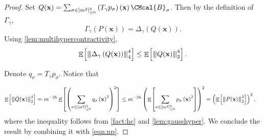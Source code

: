 \documentclass[11pt]{article}
\def\B{\CMcal{B}}
\theoremstyle{plain}
\theoremstyle{definition}
\newcommand {\minusspace} {\: \! \!}
\newcommand {\Fn} [2] {\ensuremath{ #1 \minusspace \Br{ #2 } }}
\newcommand {\br} [1] {\ensuremath{ \left( #1 \right) }}
\newcommand {\Br} [1] {\ensuremath{ \left[ #1 \right] }}
\DeclareMathOperator*{\bigE}{\mathbb{E}}
\newcommand {\expec} [2] {\Fn{\bigE_{\substack{#1}}}{#2}}
\newcommand{\nnorm}[1]{{\left\vert\kern-0.25ex\left\vert\kern-0.25ex\left\vert #1
		\right\vert\kern-0.25ex\right\vert\kern-0.25ex\right\vert}}
\newcommand{\randx}{\ensuremath{\mathbf{x}}}
\newcommand{\1}{\mathbb{1}} %
\begin{document}
	\begin{proof}

		Set $ Q(\randx)=\sum_{\sigma\in[m^2]_{\geq0}^h}\br{T_\gamma p_\sigma}\br{\randx}\B_\sigma$. Then by the definition of $\Gamma_{\gamma}$,
		\[\Gamma_{\gamma}\br{P(\randx)}=\Delta_{\gamma}\br{Q(\randx)}.\]
		\noindent Using \cref{lem:multihypercontractivity},
		\begin{equation}\label{eqn:np}
\expec{}{\nnorm{\Delta_{\gamma}\br{Q(\randx)}}_4^4}\leq\expec{}{\nnorm{Q(\randx)}_2^4}.
		\end{equation}


		Denote $q_\sigma=T_\gamma p_\sigma$. Notice that

\begin{align*}
\expec{}{\nnorm{Q(\randx)}_2^4}
=~&m^{-2h}\expec{}{\br{\sum_{\sigma\in[m^2]_{\geq0}^h}q_{\sigma}\br{\randx}^2}^2}\leq m^{-2h}\br{\expec{}{\sum_{\sigma\in[m^2]_{\geq0}^h}p_{\sigma}\br{\randx}^2}}^2
=\br{\expec{}{\nnorm{P(\randx)}_2^2}}^2,
		\end{align*}
		where the inequality follows from \cref{fact:hc} and \cref{lem:gausshyper}. We conclude the result by combining it with \cref{eqn:np}.
		
	\end{proof}
	
\end{document}
